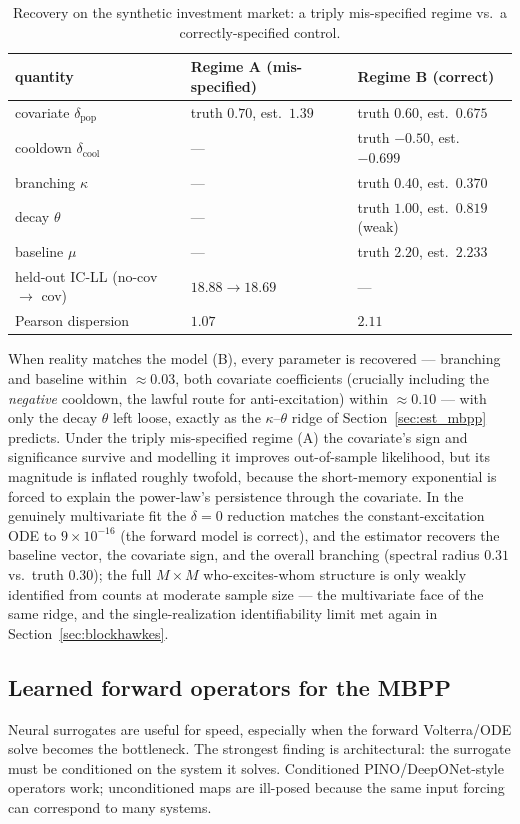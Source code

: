 \documentclass[11pt]{article}
\theoremstyle{plain}
\theoremstyle{definition}
\theoremstyle{remark}
\begin{document}
\begin{table}[h]
\centering
\caption{Recovery on the synthetic investment market: a triply mis-specified regime vs.\ a correctly-specified control.}
\label{tab:focused}
\begin{tabular}{@{}lll@{}}
\toprule
quantity & Regime A (mis-specified) & Regime B (correct) \\
\midrule
covariate $\delta_{\mathrm{pop}}$ & truth $0.70$, est.\ $1.39$ & truth $0.60$, est.\ $0.675$ \\
cooldown $\delta_{\mathrm{cool}}$ & --- & truth $-0.50$, est.\ $-0.699$ \\
branching $\kappa$ & --- & truth $0.40$, est.\ $0.370$ \\
decay $\theta$ & --- & truth $1.00$, est.\ $0.819$ (weak) \\
baseline $\mu$ & --- & truth $2.20$, est.\ $2.233$ \\
held-out IC-LL (no-cov $\to$ cov) & $18.88\to18.69$ & --- \\
Pearson dispersion & $1.07$ & $2.11$ \\
\bottomrule
\end{tabular}
\end{table}

When reality matches the model (B), every parameter is recovered --- branching and baseline within $\approx0.03$, both covariate coefficients (crucially including the \emph{negative} cooldown, the lawful route for anti-excitation) within $\approx0.10$ --- with only the decay $\theta$ left loose, exactly as the $\kappa$--$\theta$ ridge of Section~\ref{sec:est_mbpp} predicts. Under the triply mis-specified regime (A) the covariate's sign and significance survive and modelling it improves out-of-sample likelihood, but its magnitude is inflated roughly twofold, because the short-memory exponential is forced to explain the power-law's persistence through the covariate. In the genuinely multivariate fit the $\delta=0$ reduction matches the constant-excitation ODE to $9\times10^{-16}$ (the forward model is correct), and the estimator recovers the baseline vector, the covariate sign, and the overall branching (spectral radius $0.31$ vs.\ truth $0.30$); the full $M\times M$ who-excites-whom structure is only weakly identified from counts at moderate sample size --- the multivariate face of the same ridge, and the single-realization identifiability limit met again in Section~\ref{sec:blockhawkes}.

\subsection{Learned forward operators for the MBPP}
Neural surrogates are useful for speed, especially when the forward Volterra/ODE solve becomes the bottleneck. The strongest finding is architectural: the surrogate must be conditioned on the system it solves. Conditioned PINO/DeepONet-style operators work; unconditioned maps are ill-posed because the same input forcing can correspond to many systems.
\end{document}
